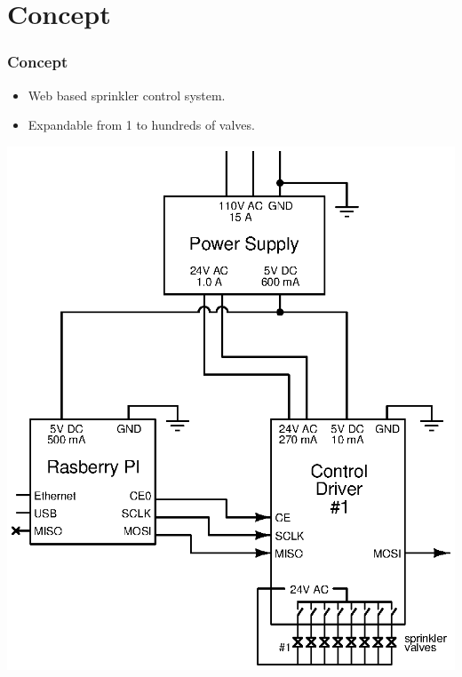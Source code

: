 \documentclass[gray]{beamer}
\begin{document}
\section{Concept}
\begin{frame}
\frametitle{Concept}
\begin{itemize}
\item Web based sprinkler control system.
\item Expandable from 1 to hundreds of valves.
\end{itemize}
\begin{center}
\includegraphics[scale=0.40]{xcircuit/hardware_overview}
\end{center}
\end{frame}

\end{document}
